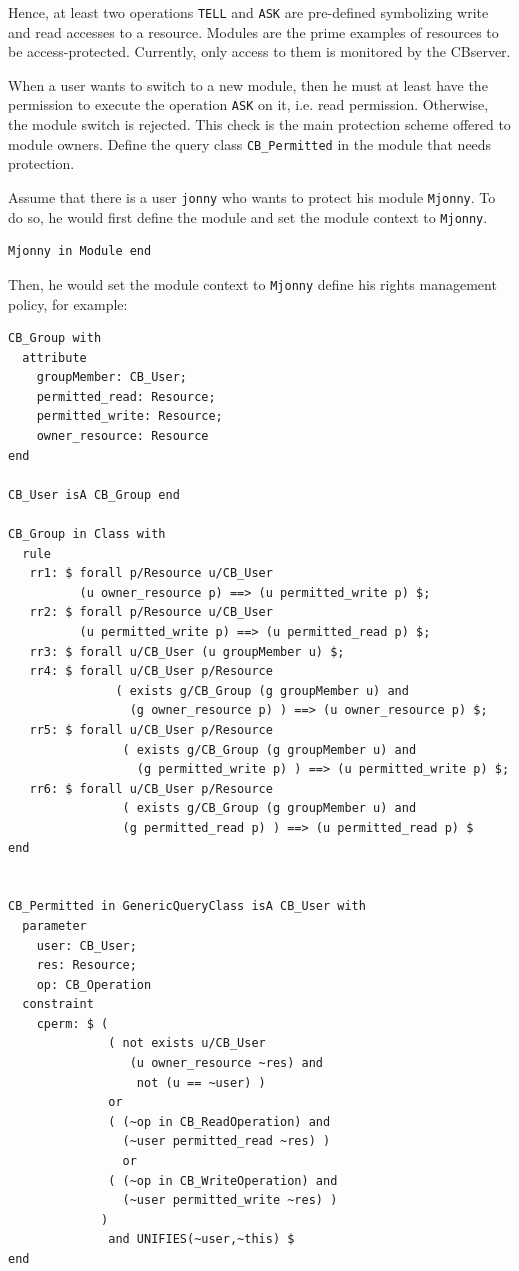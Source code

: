Hence, at least two operations {\tt TELL} and {\tt ASK} are pre-defined symbolizing write and read
accesses to a resource. Modules are the prime examples of resources to be access-protected.
Currently, only access to them is monitored by the CBserver.

When a user wants to switch to a new module, then he must at least have the permission
to execute the operation {\tt ASK} on it, i.e. read permission. Otherwise, the module
switch is rejected.
This check is the main protection scheme offered to module owners.
Define the query class {\tt CB\_Permitted} in the module that needs
protection. 

Assume that there is a user {\tt jonny} who wants to protect his module {\tt Mjonny}.
To do so, he would first define the module
 and set the module context to {\tt Mjonny}.

\begin{verbatim}
Mjonny in Module end
\end{verbatim}

Then, he would set the module context to {\tt Mjonny} define his rights management policy,
for example:

\begin{verbatim}
CB_Group with 
  attribute
    groupMember: CB_User;
    permitted_read: Resource;
    permitted_write: Resource;
    owner_resource: Resource
end

CB_User isA CB_Group end  

CB_Group in Class with
  rule
   rr1: $ forall p/Resource u/CB_User 
          (u owner_resource p) ==> (u permitted_write p) $;
   rr2: $ forall p/Resource u/CB_User 
          (u permitted_write p) ==> (u permitted_read p) $;
   rr3: $ forall u/CB_User (u groupMember u) $;  
   rr4: $ forall u/CB_User p/Resource
               ( exists g/CB_Group (g groupMember u) and 
                 (g owner_resource p) ) ==> (u owner_resource p) $;
   rr5: $ forall u/CB_User p/Resource
                ( exists g/CB_Group (g groupMember u) and 
                  (g permitted_write p) ) ==> (u permitted_write p) $;
   rr6: $ forall u/CB_User p/Resource
                ( exists g/CB_Group (g groupMember u) and 
                (g permitted_read p) ) ==> (u permitted_read p) $
end


CB_Permitted in GenericQueryClass isA CB_User with
  parameter
    user: CB_User;
    res: Resource;
    op: CB_Operation
  constraint
    cperm: $ (
              ( not exists u/CB_User 
                 (u owner_resource ~res) and 
                  not (u == ~user) ) 
              or
              ( (~op in CB_ReadOperation) and 
                (~user permitted_read ~res) ) 
                or
              ( (~op in CB_WriteOperation) and 
                (~user permitted_write ~res) )
             )
              and UNIFIES(~user,~this) $
end
\end{verbatim}

